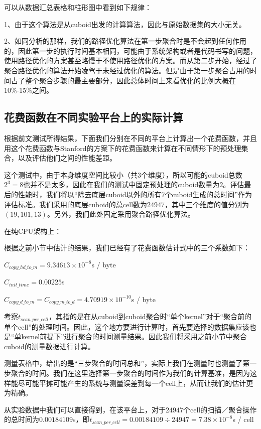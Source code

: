 可以从数据汇总表格和柱形图中看到如下规律：

1、由于这个算法是从cuboid出发的计算算法，因此与原始数据集的大小无关。

2、如同分析的那样，我们的路径优化算法在第一步聚合时是不会起到任何作用的，因此第一步的执行时间基本相同，可能由于系统架构或者是代码书写的问题，使用路径优化的方案甚至略慢于不使用路径优化的方案。而从第二步开始，经过了聚合路径优化的算法开始凌驾于未经过优化的算法。但是由于第一步聚合占用的时间占了整个聚合步骤的最主要部分，因此总体时间上来看优化的比例大概在10\%-15\%之间。

\subsection{花费函数在不同实验平台上的实际计算}

根据前文测试所得结果，下面我们分别在不同的平台上计算出一个花费函数，并且用这个花费函数与Stanford的方案下的花费函数来计算在不同情形下的预处理集合，以及评估他们之间的性能差距。

这个测试中，由于本身维度空间比较小（共$3$个维度），所以可能的cuboid总数$2^3 = 8$也并不是太多，因此在我们的测试中固定预处理的cuboid数量为$2$。评估最后的性能时，我们将以“除去底层cuboid以外的所有$7$个cuboid生成的总时间”作为评估标准。我们采用的底层cuboid的总cell数为$24947$，其中三个维度的值分别为$(19, 101, 13)$。另外，我们此处固定采用聚合路径优化算法。

在纯CPU架构上：

根据之前小节中估计的结果，我们已经有了花费函数估计式中的三个系数如下：

$C_{copy\_hd\_to\_m} = 9.34613 \times 10^{-8}$s / byte

$C_{init\_time} = 0.00225$s

$C_{copy\_d\_to\_m} = C_{copy\_m\_to\_d} = 4.70919 \times 10^{-10}$s / byte

考察$t_{scan\_per\_cell}$，其指的是在从cuboid到cuboid聚合时“单个kernel”对于“聚合前的单个cell”的处理时间。因此，这个地方要进行计算时，首先要选择的数据集应该也是“单kernel前提下”进行聚合的时间测量结果。因此我们将采用之前小节中聚合cuboid的测量数据进行计算。

测量表格中，给出的是“三步聚合的时间总和”，实际上我们在测量时也测量了第一步聚合的时间。我们在这里选择第一步聚合的时间作为我们的计算基准，是因为这样能尽可能平摊可能产生的系统与测量误差到每一个cell上，从而让我们的估计更为精确。

从实验数据中我们可以直接得到，在该平台上，对于$24947$个cell的扫描／聚合操作的总时间为$0.00184109$s，即$t_{scan\_per\_cell} = 0.00184109 \div 24947 = 7.38 \times 10^{-8}$s / cell

